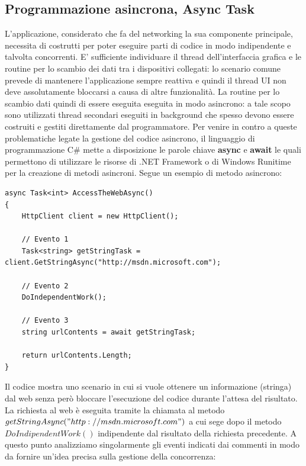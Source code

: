 \documentclass[a4]{book}
\begin{document}
\subsection{Programmazione asincrona, Async Task}
L'applicazione, considerato che fa del networking la sua componente principale, necessita di costrutti per poter eseguire parti di codice in modo indipendente e talvolta concorrenti. E' sufficiente individuare il thread dell'interfaccia grafica e le routine per lo scambio dei dati tra i dispositivi collegati: lo scenario comune prevede di mantenere l'applicazione sempre reattiva e quindi il thread UI non deve assolutamente bloccarsi a causa di altre funzionalità. La routine per lo scambio dati  quindi di essere eseguita eseguita in modo asincrono: a tale scopo sono utilizzati thread secondari eseguiti in background che spesso devono essere costruiti e gestiti direttamente dal programmatore. Per venire in contro a queste problematiche legate la gestione del codice asincrono, il linguaggio di programmazione C\# mette a disposizione le parole chiave \textbf{async} e \textbf{await} le quali permettono di utilizzare le risorse di .NET Framework o di Windows Runitime per la creazione di metodi asincroni.\newline
Segue un esempio di metodo asincrono:\newline
\begin{lstlisting}
async Task<int> AccessTheWebAsync()
{ 
	HttpClient client = new HttpClient();
	
	// Evento 1
	Task<string> getStringTask = client.GetStringAsync("http://msdn.microsoft.com");
	
	// Evento 2
	DoIndependentWork();
	
	// Evento 3
	string urlContents = await getStringTask;
	
	return urlContents.Length;
}
\end{lstlisting}
Il codice mostra uno scenario in cui si vuole ottenere un informazione (stringa) dal web senza però bloccare l'esecuzione del codice durante l'attesa del risultato. La richiesta al web è eseguita tramite la chiamata al metodo $getStringAsync("http://msdn.microsoft.com")$ a cui sege dopo il metodo $DoIndipendentWork()$  indipendente dal risultato della richiesta precedente.\newline
A questo punto analizziamo singolarmente gli eventi indicati dai commenti in modo da fornire un'idea precisa sulla gestione della concorrenza:
\end{document}
